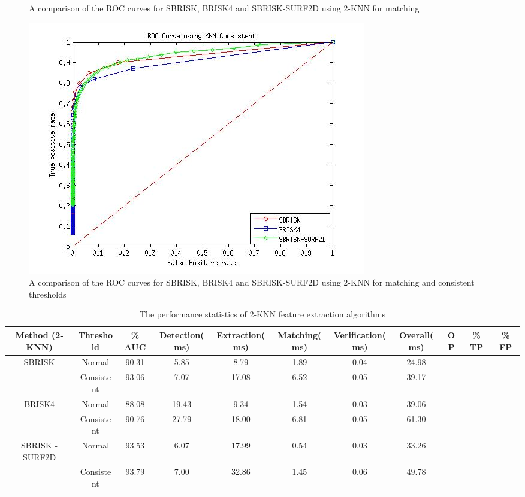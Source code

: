 \documentclass{article}
\begin{document}
\begin{figure}[h!]
\begin{minipage}[b]{0.5\linewidth}
\caption{A comparison of the ROC curves for SBRISK, BRISK4 and SBRISK-SURF2D using 2-KNN for matching}
\label{fig:compareKNN}
\end{minipage}
\begin{minipage}[b]{0.5\linewidth}
\includegraphics[scale=0.5]{../Drawings/ROC_General_KNN_Consistent.jpg}
\caption{A comparison of the ROC curves for SBRISK, BRISK4 and SBRISK-SURF2D using 2-KNN for matching and consistent thresholds}
\label{fig:compareKNNConsistent}
\end{minipage}
\end{figure}

\begin{table}
\caption{The performance statistics of 2-KNN feature extraction algorithms}
\begin{tabular}{|c|c|c|c|c|c|c|c|c|c|c|}
\hline 
Method (2-KNN) & Threshold & \% AUC & Detection(ms) & Extraction(ms) & Matching(ms) & Verification(ms) & Overall(ms) & OP & \% TP & \% FP\tabularnewline
\hline 
\hline 
SBRISK & Normal & 90.31 & 5.85 & 8.79 & 1.89 & 0.04 & 24.98 &  &  & \tabularnewline
\hline 
 & Consistent & 93.06 & 7.07 & 17.08 & 6.52 & 0.05 & 39.17 &  &  & \tabularnewline
\hline 
BRISK4 & Normal & 88.08 & 19.43 & 9.34 & 1.54 & 0.03 & 39.06 &  &  & \tabularnewline
\hline 
 & Consistent & 90.76 & 27.79 & 18.00 & 6.81 & 0.05 & 61.30 &  &  & \tabularnewline
\hline 
SBRISK - SURF2D & Normal & 93.53 & 6.07 & 17.99 & 0.54 & 0.03 & 33.26 &  &  & \tabularnewline
\hline 
 & Consistent & 93.79 & 7.00 & 32.86 & 1.45 & 0.06 & 49.78 &  &  & \tabularnewline
\hline 
\end{tabular}
\label{tab:keypointsMatchesHamming}
\end{table}
\end{document}
